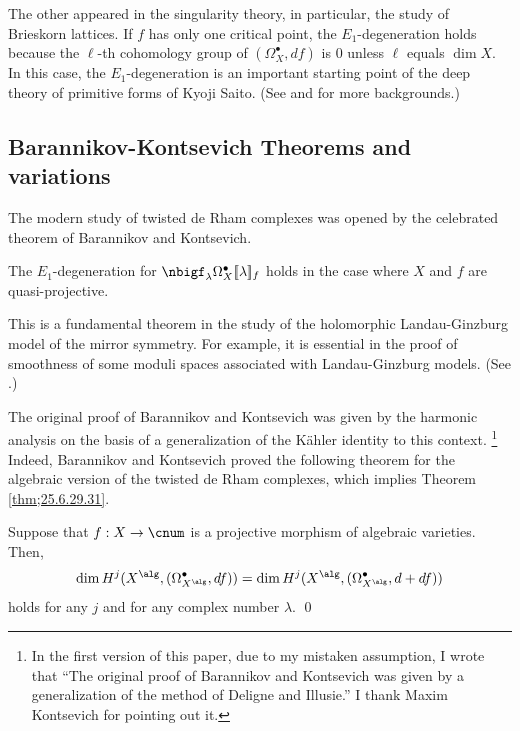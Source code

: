 \documentclass[a4,10pt]{article}
\begin{document}
The other appeared in the singularity theory,
in particular, the study of Brieskorn lattices.
If $f$ has
only one critical point,
the $E_1$-degeneration holds
because
the $\ell$-th cohomology group
of $(\Omega^{\bullet}_X,df)$
is $0$
unless $\ell$ equals $\dim X$.
In this case,
the $E_1$-degeneration is an important starting point of
the deep theory of primitive forms of Kyoji Saito.
(See \cite{Sabbah-Brieskorn}
and \cite{Saito-Takahashi} for more backgrounds.)

\subsection{Barannikov-Kontsevich Theorems and variations}
\label{subsection;25.6.26.2}

The modern study of twisted de Rham complexes
was opened by
the celebrated theorem
of Barannikov and Kontsevich.
\begin{thm}
\label{thm;25.6.29.31}
The $E_1$-degeneration
for $\nbigf_{\lambda}\Omega^{\bullet}_X[\![\lambda]\!]_f$
holds 
in the case where 
$X$ and $f$ are quasi-projective.
\end{thm}

This is a fundamental theorem
in the study
of the holomorphic Landau-Ginzburg model
of the mirror symmetry.
For example,
it is essential
in the proof of
smoothness of
some moduli spaces
associated with
Landau-Ginzburg models.
(See \cite{Katzarkov-Kontsevich-Pantev-2017}.)

The original proof of
Barannikov and Kontsevich
was given by the harmonic analysis
on the basis of a generalization of the K\"ahler identity to this context.
\footnote{
In the first version of this paper,
due to my mistaken assumption,
I wrote that 
``The original proof of Barannikov and Kontsevich
was given by a generalization of
the method of Deligne and Illusie.''
I thank Maxim Kontsevich for pointing out it.}
Indeed, 
Barannikov and Kontsevich proved the following
theorem for the algebraic version of
the twisted de Rham complexes,
which implies Theorem \ref{thm;25.6.29.31}.


\begin{thm}
\label{thm;25.6.29.30}
Suppose that $f:X\to \cnum$ is a projective morphism of
algebraic varieties.
Then, 
\[
  \dim H^{j}(X^{\alg},(\Omega^{\bullet}_{X^{\alg}},df))
=\dim H^{j}(X^{\alg},(\Omega^{\bullet}_{X^{\alg}},d+df))
\]
holds for any $j$ and for any complex number $\lambda$.
\hfill\qed
\end{thm}
\end{document}
